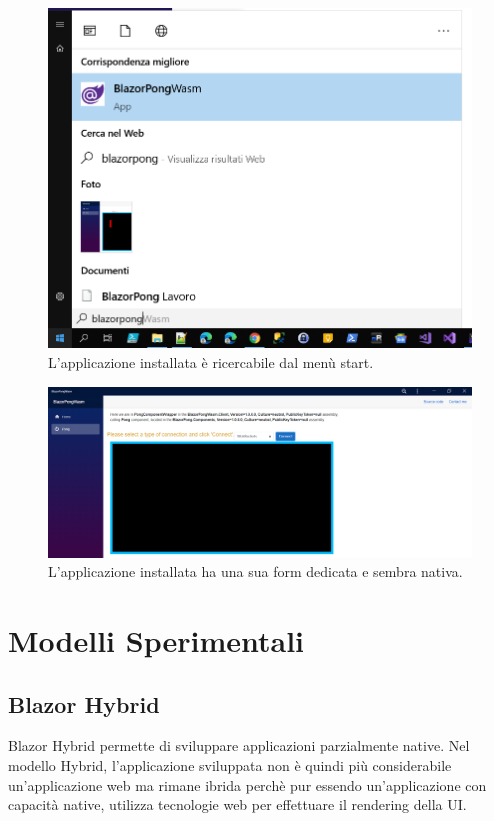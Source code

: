 \begin{figure}[H]
	\centerline{\includegraphics[scale=0.5]{figure/searchingBlazorPongWasm.png}}
	\caption{L'applicazione installata \`e ricercabile dal men\`u start.}
	\label{fig:searchingBlazorPongWasm}
\end{figure}

\begin{figure}[H]
	\centerline{\includegraphics[scale=0.25]{figure/installedBlazorPongWasm.png}}
	\caption{L'applicazione installata ha una sua form dedicata e sembra nativa.}
	\label{fig:installedBlazorPongWasm}
\end{figure}

\pagebreak

\section{Modelli Sperimentali}
\subsection{Blazor Hybrid}\label{sez:bhybrid}
Blazor Hybrid permette di sviluppare applicazioni parzialmente native.
Nel modello Hybrid, l'applicazione sviluppata non \`e quindi pi\`u considerabile un'applicazione web ma rimane ibrida perch\`e pur essendo un'applicazione con capacit\`a native, utilizza tecnologie web per effettuare il rendering della UI.

